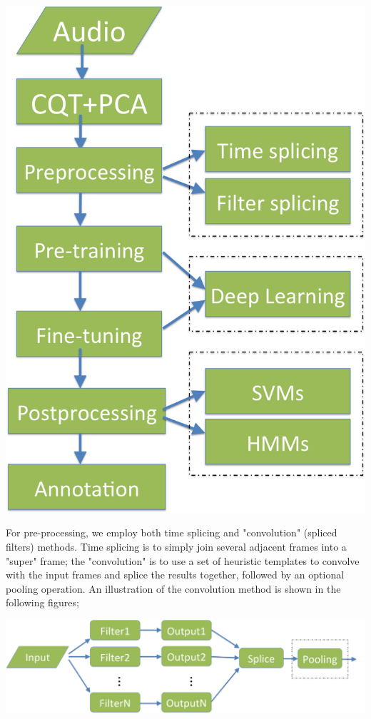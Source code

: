 \documentclass[landscape,archE1,fontscale=0.315]{baposter} %
\begin{document}
\begin{poster}
{\begin{multicols}{2}
\begin{center}
\includegraphics[width=0.60\linewidth]{flowchart}
\end{center}

For pre-processing, we employ both time splicing and "convolution" (spliced filters) methods. Time splicing is to simply join several adjacent frames into a "super" frame; the "convolution" is to use a set of heuristic templates to convolve with the input frames and splice the results together, followed by an optional pooling operation. An illustration of the convolution method is shown in the following figures;  
\begin{center}
\includegraphics[width=1.0\linewidth]{CNN.png}
\end{center}


\end{multicols}}
\end{poster}
\end{document}
